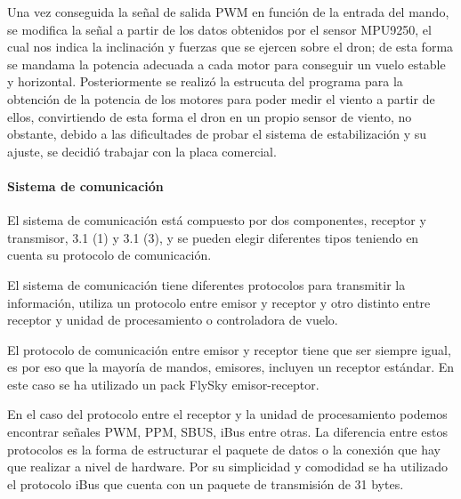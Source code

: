Una vez conseguida la señal de salida PWM en función de la entrada del mando, se modifica la señal a partir de los datos obtenidos por el sensor MPU9250, el cual nos indica la inclinación y fuerzas que se ejercen sobre el dron; de esta forma se mandama la potencia adecuada a cada motor para conseguir un vuelo estable y horizontal. Posteriormente se realizó la estrucuta del programa para la obtención de la potencia de los motores para poder medir el viento a partir de ellos, convirtiendo de esta forma el dron en un propio sensor de viento, no obstante, debido a las dificultades de probar el sistema de estabilización y su ajuste, se decidió trabajar con la placa comercial.

\paragraph{Sistema de comunicación}

	El sistema de comunicación está compuesto por dos componentes, receptor y transmisor, 3.1 (1) y 3.1 (3), y se pueden elegir diferentes tipos teniendo en cuenta su protocolo de comunicación. 
	
	El sistema de comunicación tiene diferentes protocolos para transmitir la información, utiliza un protocolo entre emisor y receptor y otro distinto entre receptor y unidad de procesamiento o controladora de vuelo\cite{Eric2017}.
	
	
	El protocolo de comunicación entre emisor y receptor tiene que ser siempre igual, es por eso que la mayoría de mandos, emisores, incluyen un receptor estándar. En este caso se ha utilizado un pack FlySky emisor-receptor.
	
	En el caso del protocolo entre el receptor y la unidad de procesamiento podemos encontrar señales PWM, PPM, SBUS, iBus entre otras. La diferencia entre estos protocolos es la forma de estructurar el paquete de datos o la conexión que hay que realizar a nivel de hardware. Por su simplicidad y comodidad se ha utilizado el protocolo iBus que cuenta con un paquete de transmisión de 31 bytes.
	